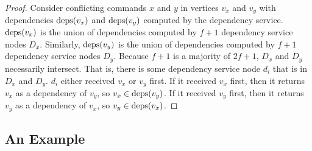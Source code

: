 \begin{proof}
  Consider conflicting commands $x$ and $y$ in vertices $v_x$ and $v_y$ with
  dependencies $\text{deps}(v_x)$ and $\text{deps}(v_y)$ computed by the dependency
  service. $\text{deps}(v_x)$ is the union of dependencies computed by $f+1$
  dependency service nodes $D_x$. Similarly, $\text{deps}(v_y)$ is the union of
  dependencies computed by $f+1$ dependency service nodes $D_y$. Because $f+1$
  is a majority of $2f+1$, $D_x$ and $D_y$ necessarily intersect. That is,
  there is some dependency service node $d_i$ that is in $D_x$ and $D_y$.
  $d_i$ either received $v_x$ or $v_y$ first.  If it received $v_x$ first, then
  it returns $v_x$ as a dependency of $v_y$, so $v_x \in \text{deps}(v_y)$.  If it
  received $v_y$ first, then it returns $v_y$ as a dependency of $v_x$, so $v_y
  \in \text{deps}(v_x)$.
\end{proof}


\subsection{An Example}
{}

